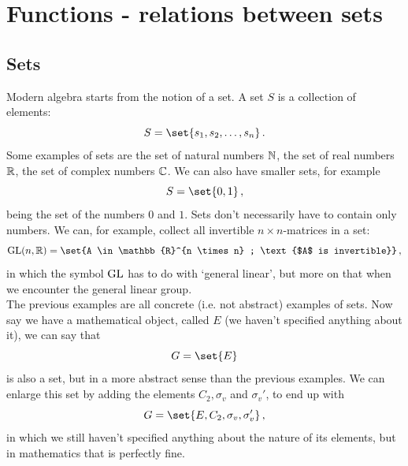 \section{Functions - relations between sets}
    \subsection{Sets}
        Modern algebra starts from the notion of a set. A set $S$ is a collection of elements:
        \begin{equation}
            S = \set{s_1, s_2, \dots, s_n} \thinspace .
        \end{equation}
        Some examples of sets are the set of natural numbers $\mathbb{N}$, the set of real numbers $\mathbb{R}$, the set of complex numbers $\mathbb{C}$. We can also have smaller sets, for example
        \begin{equation}
            S = \set{0, 1} \thinspace ,
        \end{equation}
        being the set of the numbers $0$ and $1$. Sets don't necessarily have to contain only numbers. We can, for example, collect all invertible $n \times n$-matrices in a set:
        \begin{equation}
            \GLg(n, \mathbb{R}) = \set{A \in \mathbb{R}^{n \times n} ; \text{$A$ is invertible}} \thinspace ,
        \end{equation}
        in which the symbol $\operatorname{GL}$ has to do with `general linear', but more on that when we encounter the general linear group. \\

        The previous examples are all concrete (i.e. not abstract) examples of sets. Now say we have a mathematical object, called $E$ (we haven't specified anything about it), we can say that
        \begin{equation}
            G = \set{E}
        \end{equation}
        is also a set, but in a more abstract sense than the previous examples. We can enlarge this set by adding the elements $C_2, \sigma_v$ and $\sigma_v'$, to end up with
        \begin{equation}
            G = \set{E, C_2, \sigma_v, \sigma_v'} \thinspace ,
        \end{equation}
        in which we still haven't specified anything about the nature of its elements, but in mathematics that is perfectly fine. \\

